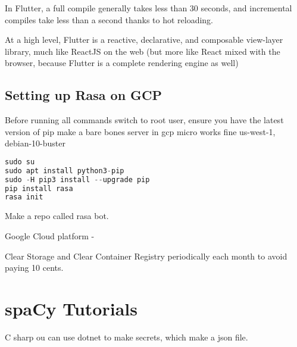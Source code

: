 
In Flutter, a full compile
generally takes less than 30 seconds, and incremental compiles take less than a second
thanks to hot reloading. 

At a high level, Flutter is a reactive, declarative, and composable view-layer library,
much like ReactJS on the web (but more like React mixed with the browser, because
Flutter is a complete rendering engine as well)


\section{Setting up Rasa on GCP}

Before running all commands switch to root user, ensure you have the latest version of pip
make a bare bones server in gcp micro works fine us-west-1, debian-10-buster

\begin{lstlisting}[language=C++, caption={Bash Script}]
sudo su
sudo apt install python3-pip
sudo -H pip3 install --upgrade pip
pip install rasa
rasa init
\end{lstlisting}

Make a repo called rasa bot.

Google Cloud platform -

Clear Storage and Clear Container Registry periodically each month to avoid paying 10 cents.

\chapter{spaCy Tutorials}

\begingroup
\UseRawInputEncoding

\endgroup








C sharp ou can use dotnet to make secrets, which make a json file.


